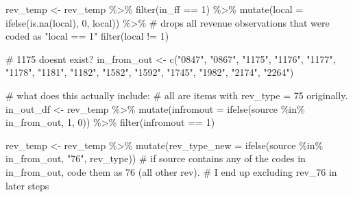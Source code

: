 \documentclass[
  letterpaper,
  DIV=11,
  numbers=noendperiod]{scrreport}
\newenvironment{Shaded}{\begin{snugshade}}{\end{snugshade}}
\newcommand{\AttributeTok}[1]{\textcolor[rgb]{0.40,0.45,0.13}{#1}}
\newcommand{\CommentTok}[1]{\textcolor[rgb]{0.37,0.37,0.37}{#1}}
\newcommand{\DecValTok}[1]{\textcolor[rgb]{0.68,0.00,0.00}{#1}}
\newcommand{\FunctionTok}[1]{\textcolor[rgb]{0.28,0.35,0.67}{#1}}
\newcommand{\NormalTok}[1]{\textcolor[rgb]{0.00,0.23,0.31}{#1}}
\newcommand{\OtherTok}[1]{\textcolor[rgb]{0.00,0.23,0.31}{#1}}
\newcommand{\SpecialCharTok}[1]{\textcolor[rgb]{0.37,0.37,0.37}{#1}}
\newcommand{\StringTok}[1]{\textcolor[rgb]{0.13,0.47,0.30}{#1}}
\begin{document}
\begin{Shaded}
\begin{Highlighting}[]
\NormalTok{rev\_temp }\OtherTok{\textless{}{-}}\NormalTok{ rev\_temp }\SpecialCharTok{\%\textgreater{}\%} 
  \FunctionTok{filter}\NormalTok{(in\_ff }\SpecialCharTok{==} \DecValTok{1}\NormalTok{) }\SpecialCharTok{\%\textgreater{}\%} 
  \FunctionTok{mutate}\NormalTok{(}\AttributeTok{local =} \FunctionTok{ifelse}\NormalTok{(}\FunctionTok{is.na}\NormalTok{(local), }\DecValTok{0}\NormalTok{, local)) }\SpecialCharTok{\%\textgreater{}\%} \CommentTok{\# drops all revenue observations that were coded as "local == 1"}
  \FunctionTok{filter}\NormalTok{(local }\SpecialCharTok{!=} \DecValTok{1}\NormalTok{)}

\CommentTok{\# 1175 doesnt exist?}
\NormalTok{in\_from\_out }\OtherTok{\textless{}{-}} \FunctionTok{c}\NormalTok{(}\StringTok{"0847"}\NormalTok{, }\StringTok{"0867"}\NormalTok{, }\StringTok{"1175"}\NormalTok{, }\StringTok{"1176"}\NormalTok{, }\StringTok{"1177"}\NormalTok{, }\StringTok{"1178"}\NormalTok{, }\StringTok{"1181"}\NormalTok{, }\StringTok{"1182"}\NormalTok{, }\StringTok{"1582"}\NormalTok{, }\StringTok{"1592"}\NormalTok{, }\StringTok{"1745"}\NormalTok{, }\StringTok{"1982"}\NormalTok{, }\StringTok{"2174"}\NormalTok{, }\StringTok{"2264"}\NormalTok{)}

\CommentTok{\# what does this actually include:}
\CommentTok{\# all are items with rev\_type = 75 originally. }
\NormalTok{in\_out\_df }\OtherTok{\textless{}{-}}\NormalTok{ rev\_temp }\SpecialCharTok{\%\textgreater{}\%}
  \FunctionTok{mutate}\NormalTok{(}\AttributeTok{infromout =} \FunctionTok{ifelse}\NormalTok{(source }\SpecialCharTok{\%in\%}\NormalTok{ in\_from\_out, }\DecValTok{1}\NormalTok{, }\DecValTok{0}\NormalTok{)) }\SpecialCharTok{\%\textgreater{}\%}
  \FunctionTok{filter}\NormalTok{(infromout }\SpecialCharTok{==} \DecValTok{1}\NormalTok{)}

\NormalTok{rev\_temp }\OtherTok{\textless{}{-}}\NormalTok{ rev\_temp }\SpecialCharTok{\%\textgreater{}\%} 
  \FunctionTok{mutate}\NormalTok{(}\AttributeTok{rev\_type\_new =} \FunctionTok{ifelse}\NormalTok{(source }\SpecialCharTok{\%in\%}\NormalTok{ in\_from\_out, }\StringTok{"76"}\NormalTok{, rev\_type))}
\CommentTok{\# if source contains any of the codes in in\_from\_out, code them as 76 (all other rev).}
\CommentTok{\# I end up excluding rev\_76 in later steps}
\end{Highlighting}
\end{Shaded}
\end{document}
